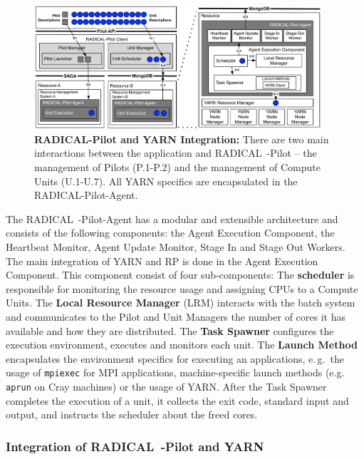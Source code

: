 \begin{figure}
    \centering
    \includegraphics[width=0.95\textwidth]{figures/data_analytics_hpc/hpc_hadoop/rp-architecture-yarn.pdf}
    \caption{\textbf{RADICAL-Pilot and YARN Integration:}
        There are two main interactions between the application and RADICAL~-Pilot -- the management of Pilots (P.1-P.2) and the management of Compute Units (U.1-U.7).
        All YARN specifics are encapsulated in the RADICAL-Pilot-Agent.\label{fig:comp_rp_arch}}
\end{figure}

The RADICAL~-Pilot-Agent has a modular and extensible architecture and consists of the following components: the Agent Execution Component, the Heartbeat Monitor, Agent Update Monitor, Stage In and Stage Out Workers.
The main integration of YARN and RP is done in the Agent Execution Component.
This component consist of four sub-components:
The {\bf scheduler} is responsible for monitoring the resource usage and assigning CPUs to a Compute Units.
The {\bf Local Resource Manager} (LRM) interacts with the batch system and communicates to the Pilot and Unit Managers the number of cores it has available and how they are distributed.
The {\bf Task Spawner} configures the execution environment, executes and monitors each unit.
The {\bf Launch Method} encapsulates the environment specifics for executing an applications, e.\,g.\ the usage of \texttt{mpiexec} for MPI applications, machine-specific launch methods (e.g. \texttt{aprun} on Cray machines) or the usage of YARN.
After the Task Spawner completes the execution of a unit, it collects the exit code, standard input and output, and instructs the scheduler about the freed cores.


\subsubsection{Integration of RADICAL~-Pilot and YARN}

